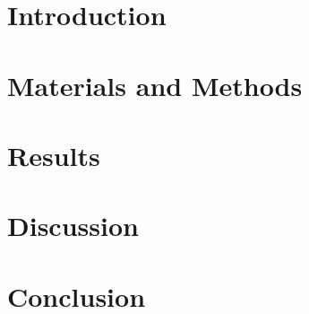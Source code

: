 \documentclass[3p, times, review, authoryear]{elsarticle}
\begin{document}
    \section{Introduction}
        

    \section{Materials and Methods}
        

    \section{Results}
        

    \section{Discussion}
        

    \section{Conclusion}
        

    
    
\end{document}
